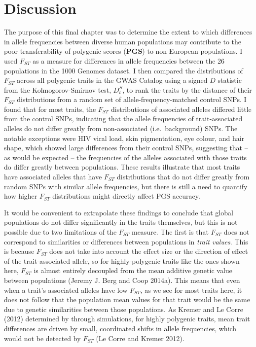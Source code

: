 \documentclass[
]{book}
\begin{document}
\hypertarget{discussion-3}{%
\section{Discussion}\label{discussion-3}}

The purpose of this final chapter was to determine the extent to which differences in allele frequencies between diverse human populations may contribute to the poor transferability of polygenic scores (\textbf{PGS}) to non-European populations. I used \(F_{ST}\) as a measure for differences in allele frequencies between the 26 populations in the 1000 Genomes dataset. I then compared the distributions of \(F_{ST}\) across all polygenic traits in the GWAS Catalog using a signed \(D\) statistic from the Kolmogorov-Smirnov test, \({D_t^S}\), to rank the traits by the distance of their \(F_{ST}\) distributions from a random set of allele-frequency-matched control SNPs. I found that for most traits, the \(F_{ST}\) distributions of associated alleles differed little from the control SNPs, indicating that the allele frequencies of trait-associated alleles do not differ greatly from non-associated (i.e.~background) SNPs. The notable exceptions were HIV viral load, skin pigmentation, eye colour, and hair shape, which showed large differences from their control SNPs, suggesting that -- as would be expected -- the frequencies of the alleles associated with those traits do differ greatly between populations. These results illustrate that most traits have associated alleles that have \(F_{ST}\) distributions that do not differ greatly from random SNPs with similar allele frequencies, but there is still a need to quantify how higher \(F_{ST}\) distributions might directly affect PGS accuracy.

It would be convenient to extrapolate these findings to conclude that global populations do not differ significantly in the traits themselves, but this is not possible due to two limitations of the \(F_{ST}\) measure. The first is that \(F_{ST}\) does not correspond to similarities or differences between populations in \emph{trait values}. This is because \(F_{ST}\) does not take into account the effect size or the direction of effect of the trait-associated allele, so for highly-polygenic traits like the ones shown here, \(F_{ST}\) is almost entirely decoupled from the mean additive genetic value between populations (Jeremy J. Berg and Coop 2014a). This means that even when a trait's associated alleles have low \(F_{ST}\), as we see for most traits here, it does not follow that the population mean values for that trait would be the same due to genetic similarities between those populations. As Kremer and Le Corre (2012) determined by through simulations, for highly polygenic traits, mean trait differences are driven by small, coordinated shifts in allele frequencies, which would not be detected by \(F_{ST}\) (Le Corre and Kremer 2012).
\end{document}
